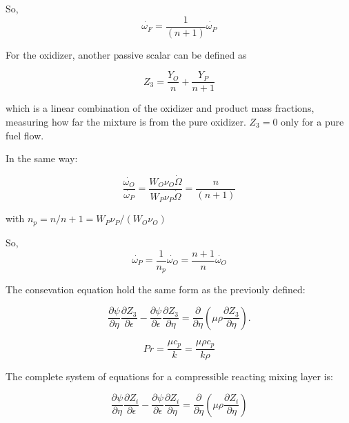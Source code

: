 So,  
\begin{equation}
    \dot{\omega_F}=\frac{1}{(n+1)}{\dot{\omega_P}}
\end{equation}
 
For the oxidizer, another passive scalar can be defined as

\begin{equation}
Z_3=
\frac{Y_O}{n}
+
\frac{Y_P}{n+1}
\end{equation}          

which is a linear combination of the oxidizer and product mass fractions,
measuring how far the mixture is from the pure oxidizer. 
$Z_3=0$ only for a pure fuel flow. 

In the same way: 

\begin{equation}
    \frac{\dot{\omega_O}}{\dot{\omega_P}}
    =
    \frac{W_O\nu_O\dot{\Omega}}{W_P\nu_P\dot{\Omega}}
    =
    \frac{n}{(n+1)} 
\end{equation}

with $n_p=n/n+1=W_P\nu_P/(W_O\nu_O)$ 

So,  
\begin{equation}
    \dot{\omega_P}=\frac{1}{n_p}{\dot{\omega_O}}
    =\frac{n+1}{n}{\dot{\omega_O}}
\end{equation}

The consevation equation hold the same form as the previouly defined: 

\begin{equation} 
\frac{\partial \psi}{\partial \eta}
\frac{\partial Z_3}{\partial \epsilon}
-
\frac{\partial \psi}{\partial \epsilon}
\frac{\partial Z_3}{\partial \eta}
=
\frac{\partial}{\partial \eta}
\left(
     \mu\rho  \frac{\partial Z_3}{\partial \eta}
\right)
.
\end{equation} 

\begin{equation}
Pr
=
\frac{\mu c_p}{k}
=\frac{\mu \rho c_p}{k\rho}
\end{equation} 


The complete system of equations for a compressible 
reacting mixing layer is: 

\begin{equation} 
\frac{\partial \psi}{\partial \eta}
\frac{\partial Z_{i}}{\partial \epsilon}
-
\frac{\partial \psi}{\partial \epsilon}
\frac{\partial Z_{i}}{\partial \eta}
=
\frac{\partial}{\partial \eta}
\left(\mu\rho  \frac{\partial Z_i}{\partial \eta}\right)
\end{equation} 


